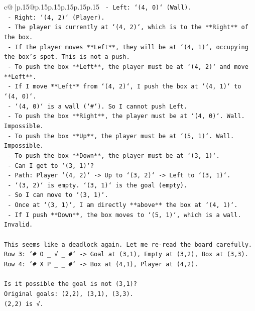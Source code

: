 \documentclass{article}
\begin{document}
{\begin{supertabular}{c@{$\;$}|p{.15\linewidth}@{}p{.15\linewidth}p{.15\linewidth}p{.15\linewidth}p{.15\linewidth}p{.15\linewidth}}
{{{\texttt{        {-} Left: `(4, 0)` (Wall).} \\
\texttt{        {-} Right: `(4, 2)` (Player).} \\
\texttt{    {-} The player is currently at `(4, 2)`, which is to the **Right** of the box.} \\
\texttt{    {-} If the player moves **Left**, they will be at `(4, 1)`, occupying the box's spot. This is not a push.} \\
\texttt{    {-} To push the box **Left**, the player must be at `(4, 2)` and move **Left**.} \\
\texttt{        {-} If I move **Left** from `(4, 2)`, I push the box at `(4, 1)` to `(4, 0)`.} \\
\texttt{        {-} `(4, 0)` is a wall (`\#`). So I cannot push Left.} \\
\texttt{    {-} To push the box **Right**, the player must be at `(4, 0)`. Wall. Impossible.} \\
\texttt{    {-} To push the box **Up**, the player must be at `(5, 1)`. Wall. Impossible.} \\
\texttt{    {-} To push the box **Down**, the player must be at `(3, 1)`.} \\
\texttt{        {-} Can I get to `(3, 1)`?} \\
\texttt{        {-} Path: Player `(4, 2)` {-}> Up to `(3, 2)` {-}> Left to `(3, 1)`.} \\
\texttt{        {-} `(3, 2)` is empty. `(3, 1)` is the goal (empty).} \\
\texttt{        {-} So I can move to `(3, 1)`.} \\
\texttt{        {-} Once at `(3, 1)`, I am directly **above** the box at `(4, 1)`.} \\
\texttt{        {-} If I push **Down**, the box moves to `(5, 1)`, which is a wall. Invalid.} \\
\\ 
\texttt{This seems like a deadlock again. Let me re{-}read the board carefully.} \\
\texttt{Row 3: `\# O \_ √ \_ \#` {-}> Goal at (3,1), Empty at (3,2), Box at (3,3).} \\
\texttt{Row 4: `\# X P \_ \_ \#` {-}> Box at (4,1), Player at (4,2).} \\
\\ 
\texttt{Is it possible the goal is not (3,1)?} \\
\texttt{Original goals: (2,2), (3,1), (3,3).} \\
\texttt{(2,2) is √.} \\
}}}
\end{supertabular}}
\end{document}
